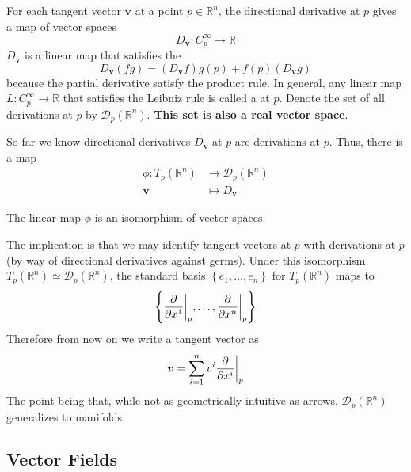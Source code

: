 For each tangent vector \(\bm{v}\) at a point \(p \in \mathbb{R}^n\), the directional derivative at \(p\) gives a map of vector spaces
%
\begin{equation*}
    D_{\bm{v}} \colon C_p^\infty \rightarrow \mathbb{R}
\end{equation*}
%
\(D_{\bm{v}}\) is a linear map that satisfies the 
%
\begin{equation}
    D_{\bm{v}}(fg) = (D_{\bm{v}}f)g(p) + f(p) (D_{\bm{v}}g)
\end{equation}
%
because the partial derivative satisfy the product rule.
%
In general, any linear map \(L\colon C_p^\infty \rightarrow \mathbb{R}\) that satisfies the Leibniz rule is called a  at \(p\).
%
Denote the set of all derivations at \(p\) by \(\mathcal{D}_p(\mathbb{R}^n)\).
%
\textbf{This set is also a real vector space}.
%

So far we know directional derivatives \(D_{\bm{v}}\) at \(p\) are derivations at \(p\).
%
Thus, there is a map
\begin{align*}
    \phi\colon T_p(\mathbb{R}^n) & \rightarrow \mathcal{D}_p (\mathbb{R}^n) \\
    \bm{v}                       & \mapsto D_{\bm{v}}
\end{align*}
%
\begin{theorem}{}{}
    The linear map \(\phi\) is an isomorphism of vector spaces.
\end{theorem}
%
\noindent The implication is that we may identify tangent vectors at \(p\) with derivations at \(p\) (by way of directional derivatives against germs).
%
Under this isomorphism \(T_p(\mathbb{R}^n) \simeq \mathcal{D}_p(\mathbb{R}^n)\), the standard basis \(\left\{ e_1, \dots, e_n \right\}\) for \(T_p(\mathbb{R}^n)\) maps to
%
\begin{equation}
    \left\{\evalat[\bigg]{\pdv{}{x^1}}{p}, \dots, \evalat[\bigg]{\pdv{}{x^n}}{p}  \right\}\label{eqn:tangentbasis}
\end{equation}
%
Therefore from now on we write a tangent vector as
%
\begin{equation}
    \bm{v} = \sum_{i=1}^{n} v^i \evalat[\bigg]{\pdv{}{x^i}}{p}
\end{equation}
%
The point being that, while not as geometrically intuitive as arrows, \(\mathcal{D}_p (\mathbb{R}^n)\) generalizes to manifolds.

\subsection{Vector Fields}


